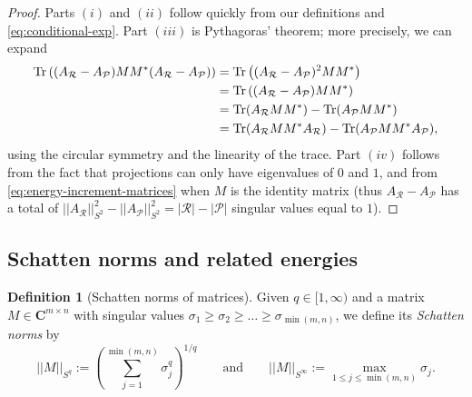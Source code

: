 \documentclass[reqno,11pt]{amsart}
\theoremstyle{definition}
\newtheorem{definition}[theorem]{Definition}
\theoremstyle{remark}
\numberwithin{equation}{section}
\newcommand{\C}{\mathbf{C}}
\newcommand{\mR}{\mathcal{R}}
\newcommand{\mP}{\mathcal{P}}
\newcommand{\Tr}{\textnormal{Tr}}
\begin{document}
\begin{proof}
Parts $(i)$ and $(ii)$ follow quickly from our definitions and \cref{eq:conditional-exp}.
Part $(iii)$ is Pythagoras' theorem; more precisely, we can expand
\[
\begin{aligned}
    \Tr\left((A_\mR - A_\mP)M M^* (A_\mR - A_\mP) \right)
    &= 
    \Tr\left((A_\mR - A_\mP)^2 M M^*\right)
    \\
    &= 
    \Tr\left((A_\mR - A_\mP) M M^*\right)
    \\
    &=
    \Tr(A_\mR M M^*) - \Tr(A_\mP M M^*)
    \\
    &= 
    \Tr(A_\mR M M^* A_\mR) - \Tr(A_\mP M M^* A_\mP),
\end{aligned}
\]
using the circular symmetry and the linearity of the trace. Part $(iv)$ follows from the fact that projections can only have eigenvalues of $0$ and $1$, and from \cref{eq:energy-increment-matrices} when $M$ is the identity matrix (thus $A_\mR - A_\mP$ has a total of $||A_\mR||_{S^2}^2 - ||A_\mP||_{S^2}^2 = |\mR| - |\mP|$ singular values equal to $1$).
\end{proof}



\subsection{Schatten norms and related energies} \label{subsec:Schatten}


\begin{definition}[Schatten norms of matrices]
Given $q \in [1, \infty)$ and a matrix $M \in \C^{m \times n}$ with singular values $\sigma_1 \ge \sigma_2 \ge \ldots \ge \sigma_{\min(m,n)}$, we define its \emph{Schatten norms} by
\[
    ||M||_{S^q} := \left(\sum_{j=1}^{\min(m,n)} \sigma_j^q\right)^{1/q}
    \qquad\text{and}\qquad 
    ||M||_{S^\infty} := \max_{1 \le j \le \min(m,n)} \sigma_j.
\]
\end{definition}
\end{document}
